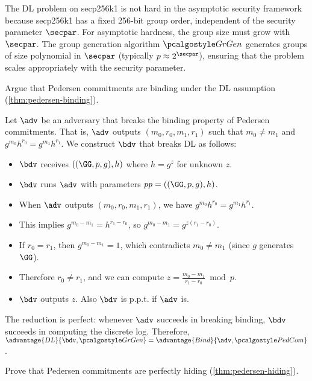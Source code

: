 \ifsolutions
\begin{mysolution}
  The DL problem on secp256k1 is not hard in the asymptotic security framework because secp256k1 has a fixed 256-bit group order, independent of the security parameter $\secpar$.
  For asymptotic hardness, the group size must grow with $\secpar$.
  The group generation algorithm $\grgen$ generates groups of size polynomial in $\secpar$ (typically $p \approx 2^\secpar$), ensuring that the problem scales appropriately with the security parameter.
\end{mysolution}
\fi

\begin{exercise}
  Argue that Pedersen commitments are binding under the DL assumption (\autoref{thm:pedersen-binding}).
\end{exercise}

\ifsolutions
\begin{mysolution}
  Let $\adv$ be an adversary that breaks the binding property of Pedersen commitments.
  That is, $\adv$ outputs $(m_0, r_0, m_1, r_1)$ such that $m_0 \neq m_1$ and $g^{m_0}h^{r_0} = g^{m_1}h^{r_1}$.
  We construct $\bdv$ that breaks DL as follows:
  \begin{itemize}
    \item $\bdv$ receives $(\gparam, h)$ where $h = g^z$ for unknown $z$.
    \item $\bdv$ runs $\adv$ with parameters $\params = (\gparam, h)$.
    \item When $\adv$ outputs $(m_0, r_0, m_1, r_1)$, we have $g^{m_0}h^{r_0} = g^{m_1}h^{r_1}$.
    \item This implies $g^{m_0 - m_1} = h^{r_1 - r_0}$, so $g^{m_0 - m_1} = g^{z(r_1 - r_0)}$.
    \item If $r_0 = r_1$, then $g^{m_0 - m_1} = 1$, which contradicts $m_0 \neq m_1$ (since $g$ generates $\GG$).
    \item Therefore $r_0 \neq r_1$, and we can compute $z = \frac{m_0 - m_1}{r_1 - r_0} \bmod p$.
    \item $\bdv$ outputs $z$. Also $\bdv$ is p.p.t. if $\adv$ is.
  \end{itemize}
  The reduction is perfect: whenever $\adv$ succeeds in breaking binding, $\bdv$ succeeds in computing the discrete log.
  Therefore, $\advantage{DL}{\bdv, \grgen} = \advantage{Bind}{\adv, \algo{PedCom}}$.
\end{mysolution}
\fi

\begin{exercise}
  Prove that Pedersen commitments are perfectly hiding (\autoref{thm:pedersen-hiding}).
\end{exercise}

